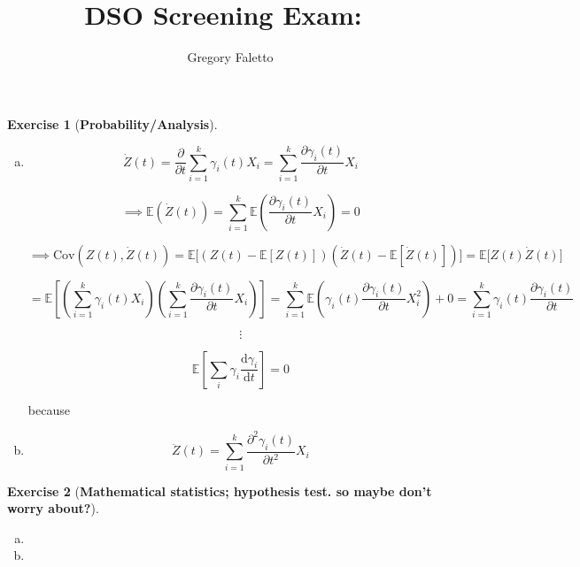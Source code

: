 \documentclass{article}
\title{
    \vspace{2in}
    \textmd{\textbf{DSO Screening Exam:\ \hmwkTitle}}\\
    \vspace{3in}
}
\author{Gregory Faletto}
\date{}
\theoremstyle{definition}
\newtheorem{exercise}{Exercise}
\theoremstyle{definition}
\theoremstyle{definition}
\theoremstyle{definition}
\newcommand{\E}{\mathbb{E}}
\newcommand{\deriv}[2]{\frac{\mathrm{d} #1}{\mathrm{d} #2}}
\newcommand{\pderiv}[2]{\frac{\partial #1}{\partial #2}}
\newcommand{\Cov}{\mathrm{Cov}}
\begin{document}
\maketitle

\pagebreak


\begin{exercise}[\textbf{Probability/Analysis}]

\begin{enumerate}[(a)]

\item

\[
\dot{Z}(t) =  \pderiv{}{t} \sum_{i=1}^k \gamma_i(t) X_i =   \sum_{i=1}^k   \pderiv{\gamma_i(t) }{t} X_i 
\]

\[
\implies \E \left( \dot{Z}(t)  \right) =    \sum_{i=1}^k   \E \left( \pderiv{\gamma_i(t) }{t} X_i \right) = 0
\]

\[
\implies \Cov(Z(t), \dot{Z}(t)) = \E \big[ (Z(t) - \E[ Z(t)])(\dot{Z}(t)  - \E[\dot{Z}(t) ]) \big]  = \E \big[ Z(t) \dot{Z}(t)  \big]  
\]

\[
= \E \left[  \left(  \sum_{i=1}^k \gamma_i(t) X_i   \right) \left( \sum_{i=1}^k   \pderiv{\gamma_i(t) }{t} X_i  \right)  \right] = \sum_{i=1}^k \E \left( \gamma_i(t)  \pderiv{\gamma_i(t) }{t}  X_i^2 \right) + 0 = \sum_{i=1}^k \gamma_i(t)  \pderiv{\gamma_i(t) }{t} 
\]

\[
\vdots
\]

\[
\E \left[ \sum_i \gamma_i \deriv{\gamma_i}{t} \right] = 0 
\]

because

\item

\[
\ddot{Z}(t) =  \sum_{i=1}^k   \pderiv{^2\gamma_i(t) }{t^2} X_i 
\]

\end{enumerate}

\end{exercise}

\begin{exercise}[\textbf{Mathematical statistics; hypothesis test. so maybe don't worry about?}]

\begin{enumerate}[(a)]

\item

\item

\end{enumerate}

\end{exercise}
\end{document}
